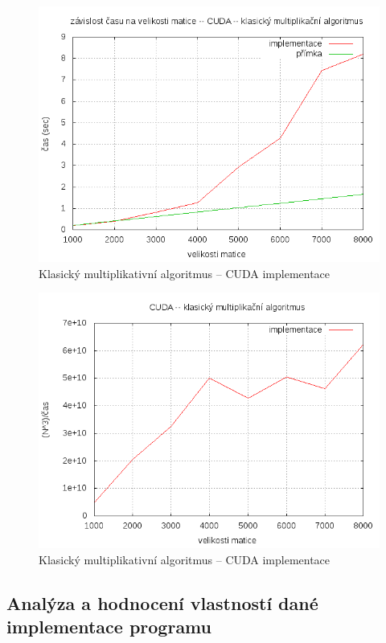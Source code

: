 \documentclass[12pt,a4paper]{article}
\begin{document}
\pagebreak
\begin{figure}[h]
\includegraphics[width=\textwidth]{graph/cuda/cuda1.png}
\caption{Klasický multiplikativní algoritmus -- CUDA implementace}
\label{cuda1}
\end{figure}

\pagebreak
\begin{figure}[h]
\includegraphics[width=\textwidth]{graph/cuda/cuda2.png}
\caption{Klasický multiplikativní algoritmus -- CUDA implementace}
\label{cuda1}
\end{figure}


\subsection{Analýza a hodnocení vlastností dané implementace programu}
\end{document}

